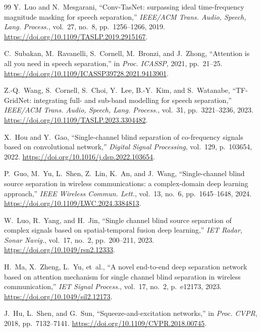 \documentclass[twocolumn,english]{svjour3}
\begin{document}

\begin{thebibliography}{99}
Y.~Luo and N.~Mesgarani,
``Conv-TasNet: surpassing ideal time-frequency magnitude masking for speech separation,''
\emph{IEEE/ACM Trans. Audio, Speech, Lang. Process.}, vol.~27, no.~8, pp.~1256--1266, 2019. \url{https://doi.org/10.1109/TASLP.2019.2915167}.

C.~Subakan, M.~Ravanelli, S.~Cornell, M.~Bronzi, and J.~Zhong,
``Attention is all you need in speech separation,''
in \emph{Proc. ICASSP}, 2021, pp.~21--25. \url{https://doi.org/10.1109/ICASSP39728.2021.9413901}.

Z.-Q.~Wang, S.~Cornell, S.~Choi, Y.~Lee, B.-Y.~Kim, and S.~Watanabe,
``TF-GridNet: integrating full- and sub-band modelling for speech separation,''
\emph{IEEE/ACM Trans. Audio, Speech, Lang. Process.}, vol.~31, pp.~3221--3236, 2023. \url{https://doi.org/10.1109/TASLP.2023.3304482}.

X.~Hou and Y.~Gao,
``Single-channel blind separation of co-frequency signals based on convolutional network,''
\emph{Digital Signal Processing}, vol.~129, p.~103654, 2022. \url{https://doi.org/10.1016/j.dsp.2022.103654}.

P.~Guo, M.~Yu, L.~Shen, Z.~Lin, K.~An, and J.~Wang,
``Single-channel blind source separation in wireless communications: a complex-domain deep learning approach,''
\emph{IEEE Wireless Commun. Lett.}, vol.~13, no.~6, pp.~1645--1648, 2024. \url{https://doi.org/10.1109/LWC.2024.3384813}.

W.~Luo, R.~Yang, and H.~Jin,
``Single channel blind source separation of complex signals based on spatial-temporal fusion deep learning,''
\emph{IET Radar, Sonar Navig.}, vol.~17, no.~2, pp.~200--211, 2023. \url{https://doi.org/10.1049/rsn2.12333}.

H.~Ma, X.~Zheng, L.~Yu, et~al.,
``A novel end-to-end deep separation network based on attention mechanism for single channel blind separation in wireless communication,''
\emph{IET Signal Process.}, vol.~17, no.~2, p.~e12173, 2023. \url{https://doi.org/10.1049/sil2.12173}.

J.~Hu, L.~Shen, and G.~Sun,
``Squeeze-and-excitation networks,''
in \emph{Proc. CVPR}, 2018, pp.~7132--7141. \url{https://doi.org/10.1109/CVPR.2018.00745}.


\end{thebibliography}
\end{document}
